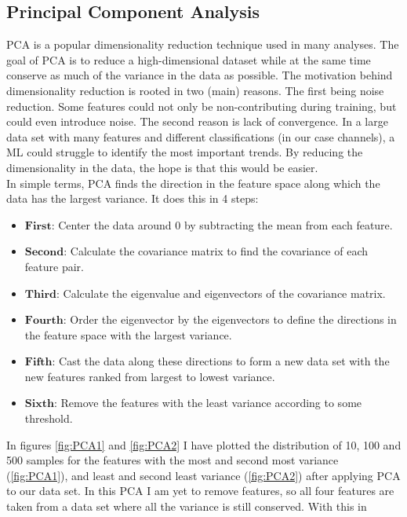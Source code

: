 \subsection{Principal Component Analysis}
\ac{PCA} is a popular dimensionality reduction technique used in many analyses. The goal of
\ac{PCA} is to reduce a high-dimensional dataset while at the same time conserve as much of the 
variance in the data as possible. The motivation behind dimensionality reduction is rooted in 
two (main) reasons. The first being noise reduction. Some features could not only be non-contributing 
during training, but could even introduce noise. The second reason is lack of convergence. In a large 
data set with many features and different classifications (in our case channels), a \ac{ML} could struggle
to identify the most important trends. By reducing the dimensionality in the data, the hope is that this 
would be easier. 
\\
In simple terms, \ac{PCA} finds the direction in the feature space along which the data has the largest 
variance. It does this in 4 steps:
\begin{itemize}
    \item $\textbf{First}$: Center the data around 0 by subtracting the mean from each feature.
    \item $\textbf{Second}$: Calculate the covariance matrix to find the covariance 
                             of each feature pair.
    \item $\textbf{Third}$: Calculate the eigenvalue and eigenvectors of the covariance matrix.
    \item $\textbf{Fourth}$: Order the eigenvector by the eigenvectors to define the directions 
                             in the feature space with the largest variance.
    \item $\textbf{Fifth}$: Cast the data along these directions to form a new data set with 
                             the new features ranked from largest to lowest variance.
    \item $\textbf{Sixth}$: Remove the features with the least variance according to some threshold.                      
\end{itemize}
In figures \ref{fig:PCA1} and \ref{fig:PCA2} I have plotted the distribution of 10, 100 and 500 samples 
for the features with the most and second most variance (\ref{fig:PCA1}), and least and second least 
variance (\ref{fig:PCA2}) after applying \ac{PCA} to our data set. In this \ac{PCA} I am yet to remove features, 
so all four features are taken from a data set where all the variance is still conserved. With this in 
